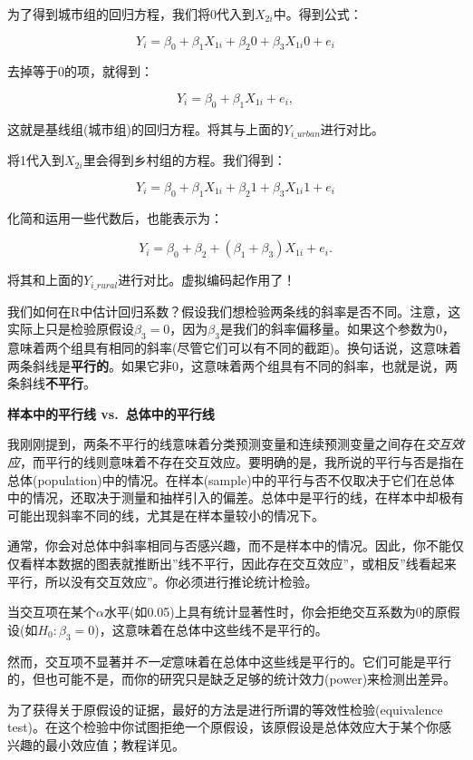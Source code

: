 \documentclass[
]{book}
\begin{document}
为了得到城市组的回归方程，我们将0代入到\(X_{2i}\)中。得到公式：

\[Y_{i} = \beta_0 + \beta_1 X_{1i} + \beta_2 0 + \beta_3 X_{1i} 0 + e_i\]

去掉等于0的项，就得到：

\[Y_{i} = \beta_0 + \beta_1 X_{1i} + e_i,\]

这就是基线组(城市组)的回归方程。将其与上面的\(Y_{i\_urban}\)进行对比。

将1代入到\(X_{2i}\)里会得到乡村组的方程。我们得到：

\[Y_{i} = \beta_0 + \beta_1 X_{1i} + \beta_2 1 + \beta_3 X_{1i} 1 + e_i\]

化简和运用一些代数后，也能表示为：

\[Y_{i} = \beta_0 + \beta_2 + (\beta_1 + \beta_3) X_{1i} + e_i.\]

将其和上面的\(Y_{i\_rural}\)进行对比。虚拟编码起作用了！

我们如何在R中估计回归系数？假设我们想检验两条线的斜率是否不同。注意，这实际上只是检验原假设\(\beta_3 = 0\)，因为\(\beta_3\)是我们的斜率偏移量。如果这个参数为0，意味着两个组具有相同的斜率(尽管它们可以有不同的截距)。换句话说，这意味着两条斜线是\textbf{平行的}。如果它非0，这意味着两个组具有不同的斜率，也就是说，两条斜线\textbf{不平行}。

\textbf{样本中的平行线 vs.~总体中的平行线}

我刚刚提到，两条不平行的线意味着分类预测变量和连续预测变量之间存在\emph{交互效应}，而平行的线则意味着不存在交互效应。要明确的是，我所说的平行与否是指在总体(population)中的情况。在样本(sample)中的平行与否不仅取决于它们在总体中的情况，还取决于测量和抽样引入的偏差。总体中是平行的线，在样本中却极有可能出现斜率不同的线，尤其是在样本量较小的情况下。

通常，你会对总体中斜率相同与否感兴趣，而不是样本中的情况。因此，你不能仅仅看样本数据的图表就推断出''线不平行，因此存在交互效应''，或相反''线看起来平行，所以没有交互效应''。你必须进行推论统计检验。

当交互项在某个\(\alpha\)水平(如0.05)上具有统计显著性时，你会拒绝交互系数为0的原假设(如\(H_0: \beta_3 = 0\))，这意味着在总体中这些线不是平行的。

然而，交互项不显著并\emph{不一定}意味着在总体中这些线是平行的。它们可能是平行的，但也可能不是，而你的研究只是缺乏足够的统计效力(power)来检测出差异。

为了获得关于原假设的证据，最好的方法是进行所谓的等效性检验(equivalence test)。在这个检验中你试图拒绝一个原假设，该原假设是总体效应大于某个你感兴趣的最小效应值；教程详见\citep{Lakens_Scheel_Isager_2018}。
\end{document}

